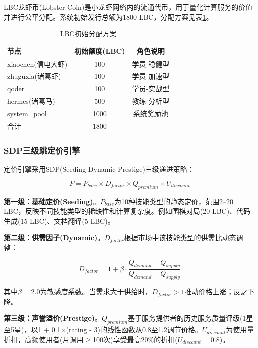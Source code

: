\documentclass[12pt,a4paper]{ctexart}
\begin{document}
LBC龙虾币(Lobster Coin)是小龙虾网络内的流通代币，用于量化计算服务的价值并进行公平分配。系统初始发行总额为1800 LBC，分配方案见表\ref{tab:lbc_init}。

\begin{table}[H]
\centering
\caption{LBC初始分配方案}
\label{tab:lbc_init}
\begin{tabular}{lcc}
\toprule
节点 & 初始额度(LBC) & 角色说明 \\
\midrule
xiaochen(信电大虾) & 100 & 学员-稳健型 \\
zhuguxia(诸葛虾)   & 100 & 学员-加速型 \\
qoder              & 100 & 学员-实战型 \\
hermes(诸葛马)     & 500 & 教练-分析型 \\
system\_pool       & 1000 & 系统奖励池 \\
\midrule
合计                & 1800 & \\
\bottomrule
\end{tabular}
\end{table}

\subsubsection{SDP三级跳定价引擎}

定价引擎采用SDP(Seeding-Dynamic-Prestige)三级递进策略：

\begin{equation}
P = P_{base} \times D_{factor} \times Q_{premium} \times U_{discount}
\label{eq:sdp}
\end{equation}

\textbf{第一级：基础定价(Seeding)}。$P_{base}$为10种技能类型的静态定价，范围2--20 LBC，反映不同技能类型的稀缺性和计算复杂度。例如围棋对局(20 LBC)、代码生成(15 LBC)、文档翻译(5 LBC)。

\textbf{第二级：供需因子(Dynamic)}。$D_{factor}$根据市场中该技能类型的供需比动态调整：

\begin{equation}
D_{factor} = 1 + \beta \cdot \frac{Q_{demand} - Q_{supply}}{Q_{demand} + Q_{supply}}
\label{eq:demand_factor}
\end{equation}

其中$\beta=2.0$为敏感度系数。当需求大于供给时，$D_{factor} > 1$推动价格上涨；反之下降。

\textbf{第三级：声誉溢价(Prestige)}。$Q_{premium}$基于服务提供者的历史服务质量评级(1星至5星)，以1 + 0.1×(rating - 3)的线性函数从0.8至1.2调节价格。$U_{discount}$为使用量折扣，高频使用者(月调用$\geq$100次)享受最高20\%的折扣($U_{discount}=0.8$)。
\end{document}
